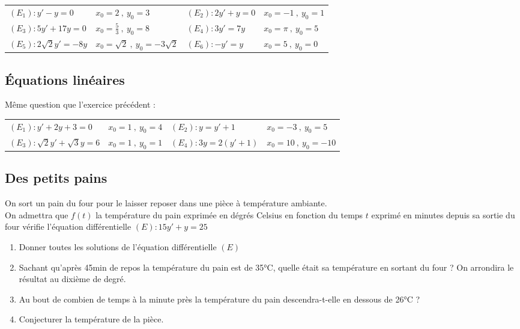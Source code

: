 \documentclass[oneside,12pt]{article}          %
\begin{document}
\begin{tabular}{p{} p{} | p{} p{}}
    $(E_1):y'-y=0$ & $x_0=2 ~,~ y_0=3$ & $(E_2):2y'+y=0$ & $x_0=-1 ~,~ y_0=1$ \\
    $(E_3):5y'+17y=0$ & $x_0=\frac{5}{3} ~,~ y_0=8$ & $(E_4):3y'=7y$ & $x_0=\pi ~,~ y_0=5$ \\
    $(E_5):2\sqrt{2}y'=-8y$ & $x_0=\sqrt{2} ~,~ y_0=-3\sqrt{2}$ & $(E_6):-y'=y$ & $x_0=5 ~,~ y_0=0$ \\
\end{tabular}



\subsection{Équations linéaires}
  Même question que l'exercice précédent :

\begin{tabular}{p{} p{} | p{} p{}}
    $(E_1):y'+2y+3=0$ & $x_0=1 ~,~ y_0=4$ & $(E_2):y=y'+1$ & $x_0=-3 ~,~ y_0=5$ \\
    $(E_3):\sqrt{2}y'+\sqrt{3}y=6$ & $x_0=1 ~,~ y_0=1$ & $(E_4):3y=2(y'+1)$ & $x_0=10 ~,~ y_0=-10$ \\
\end{tabular}



\subsection{Des petits pains}
On sort un pain du four pour le laisser reposer dans une pièce à température ambiante.\\
On admettra que $f(t)$ la température du pain exprimée en dégrés Celsius en fonction du temps $t$ exprimé en minutes depuis sa sortie du four vérifie l'équation différentielle $(E):15y'+y=25$

\begin{enumerate}
    \item Donner toutes les solutions de l'équation différentielle $(E)$
    \item Sachant qu'après 45min de repos la température du pain est de 35°C, quelle était sa température en sortant du four ? On arrondira le résultat au dixième de degré.
    \item Au bout de combien de temps à la minute près la température du pain descendra-t-elle en dessous de 26°C ?
    \item Conjecturer la température de la pièce.
\end{enumerate}
\end{document}
